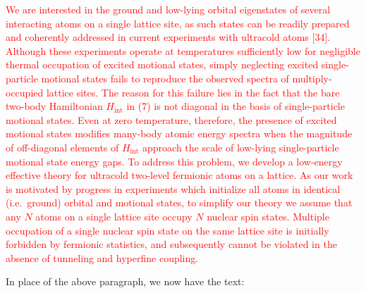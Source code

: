 \documentclass[preprint]{revtex4-1}
\renewcommand{\t}{\text} %
\newcommand{\1}{\mathds{1}}
\newcommand{\red}[1]{\textcolor{red}{#1}}
\newcounter{point}
\begin{document}
\begin{enumerate}[label=(R1.\arabic{point}.\arabic*)]
  \red{We are interested in the ground and low-lying orbital
    eigenstates of several interacting atoms on a single lattice site,
    as such states can be readily prepared and coherently addressed in
    current experiments with ultracold atoms [34].  Although these
    experiments operate at temperatures sufficiently low for
    negligible thermal occupation of excited motional states, simply
    neglecting excited single-particle motional states fails to
    reproduce the observed spectra of multiply-occupied lattice sites.
    The reason for this failure lies in the fact that the bare
    two-body Hamiltonian $H_{\t{int}}$ in (7) is not diagonal in the
    basis of single-particle motional states.  Even at zero
    temperature, therefore, the presence of excited motional states
    modifies many-body atomic energy spectra when the magnitude of
    off-diagonal elements of $H_{\t{int}}$ approach the scale of
    low-lying single-particle motional state energy gaps.  To address
    this problem, we develop a low-energy effective theory for
    ultracold two-level fermionic atoms on a lattice.  As our work is
    motivated by progress in experiments which initialize all atoms in
    identical (i.e.~ground) orbital and motional states, to simplify
    our theory we assume that any $N$ atoms on a single lattice site
    occupy $N$ nuclear spin states.  Multiple occupation of a single
    nuclear spin state on the same lattice site is initially forbidden
    by fermionic statistics, and subsequently cannot be violated in
    the absence of tunneling and hyperfine coupling.}

  In place of the above paragraph, we now have the text:


\end{enumerate}
\end{document}
